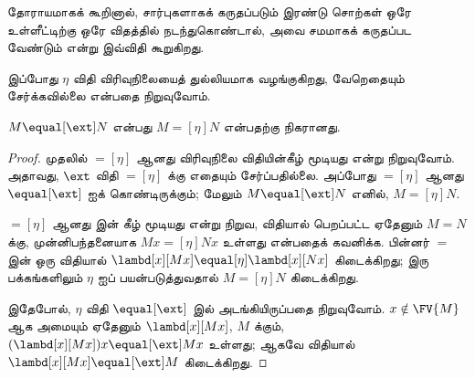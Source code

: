 \documentclass[../../../include/open-logic-section]{subfiles}
\begin{document}
தோராயமாகக் கூறினால், சார்புகளாகக் கருதப்படும் இரண்டு சொற்கள் ஒரே உள்ளீட்டிற்கு
ஒரே விதத்தில் நடந்துகொண்டால், அவை சமமாகக் கருதப்பட வேண்டும் என்று இவ்விதி
கூறுகிறது.

இப்போது $\eta$ விதி விரிவுநிலையைத் துல்லியமாக வழங்குகிறது, வேறெதையும்
சேர்க்கவில்லை என்பதை நிறுவுவோம்.

\begin{thm}
  $M \equal[\ext] N$ என்பது $M \equal[\eta] N$ என்பதற்கு நிகரானது.
\end{thm}

\begin{proof}
  முதலில் $\equal[\eta]$ ஆனது விரிவுநிலை விதியின்கீழ் மூடியது என்று
  நிறுவுவோம். அதாவது, $\ext$ விதி $\equal[\eta]$ க்கு எதையும் சேர்ப்பதில்லை.
  அப்போது $\equal[\eta]$ ஆனது $\equal[\ext]$ ஐக் கொண்டிருக்கும்; மேலும்
  $M \equal[\ext] N$ எனில், $M \equal[\eta] N$.

  $\equal[\eta]$ ஆனது \ext{} இன் கீழ் மூடியது என்று நிறுவ, \ext{} விதியால்
  பெறப்பட்ட ஏதேனும் $M \equal N$ க்கு, முன்னிபந்தனையாக $Mx
  \equal[\eta] Nx$ உள்ளது என்பதைக் கவனிக்க. பின்னர் $\equal$ இன் ஒரு விதியால்
  $\lambd[x][Mx] \equal[\eta] \lambd[x][Nx]$ கிடைக்கிறது; இரு பக்கங்களிலும்
  $\eta$ ஐப் பயன்படுத்துவதால் $M \equal[\eta] N$ கிடைக்கிறது.

  இதேபோல், $\eta$ விதி $\equal[\ext]$ இல் அடங்கியிருப்பதை நிறுவுவோம்.
  $x \notin \FV{M}$ ஆக அமையும் ஏதேனும் $\lambd[x][Mx]$, $M$ க்கும்,
  $(\lambd[x][Mx])x \equal[\ext] Mx$ உள்ளது; ஆகவே \ext{} விதியால்
  $\lambd[x][Mx] \equal[\ext] M$ கிடைக்கிறது.
\end{proof}
\end{document}
